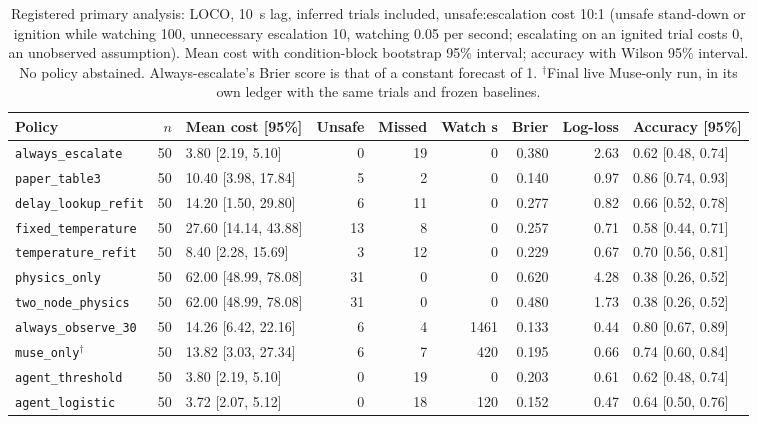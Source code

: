 \documentclass[11pt]{article}
\begin{document}
\begin{table}[t]
\centering\scriptsize
\caption{Registered primary analysis: LOCO, 10~s lag, inferred trials included, unsafe:escalation cost 10:1 (unsafe
stand-down or ignition while watching 100, unnecessary escalation 10, watching 0.05 per second; escalating on an
ignited trial costs 0, an unobserved assumption). Mean cost with condition-block bootstrap 95\% interval; accuracy
with Wilson 95\% interval. No policy abstained. Always-escalate's Brier score is that of a constant forecast of 1. $^\dagger$Final live
Muse-only run, in its own ledger with the same trials and frozen baselines.}
\label{tab:loco}
\setlength{\tabcolsep}{3pt}
\begin{tabular}{@{}lrlrrrrrl@{}}
\toprule
Policy & $n$ & Mean cost [95\%] & Unsafe & Missed & Watch s & Brier & Log-loss & Accuracy [95\%] \\
\midrule
\texttt{always\_escalate} & 50 & 3.80 [2.19, 5.10] & 0 & 19 & 0 & 0.380 & 2.63 & 0.62 [0.48, 0.74] \\
\texttt{paper\_table3} & 50 & 10.40 [3.98, 17.84] & 5 & 2 & 0 & 0.140 & 0.97 & 0.86 [0.74, 0.93] \\
\texttt{delay\_lookup\_refit} & 50 & 14.20 [1.50, 29.80] & 6 & 11 & 0 & 0.277 & 0.82 & 0.66 [0.52, 0.78] \\
\texttt{fixed\_temperature} & 50 & 27.60 [14.14, 43.88] & 13 & 8 & 0 & 0.257 & 0.71 & 0.58 [0.44, 0.71] \\
\texttt{temperature\_refit} & 50 & 8.40 [2.28, 15.69] & 3 & 12 & 0 & 0.229 & 0.67 & 0.70 [0.56, 0.81] \\
\texttt{physics\_only} & 50 & 62.00 [48.99, 78.08] & 31 & 0 & 0 & 0.620 & 4.28 & 0.38 [0.26, 0.52] \\
\texttt{two\_node\_physics} & 50 & 62.00 [48.99, 78.08] & 31 & 0 & 0 & 0.480 & 1.73 & 0.38 [0.26, 0.52] \\
\texttt{always\_observe\_30} & 50 & 14.26 [6.42, 22.16] & 6 & 4 & 1461 & 0.133 & 0.44 & 0.80 [0.67, 0.89] \\
\texttt{muse\_only}$^\dagger$ & 50 & 13.82 [3.03, 27.34] & 6 & 7 & 420 & 0.195 & 0.66 & 0.74 [0.60, 0.84] \\
\midrule
\texttt{agent\_threshold} & 50 & 3.80 [2.19, 5.10] & 0 & 19 & 0 & 0.203 & 0.61 & 0.62 [0.48, 0.74] \\
\texttt{agent\_logistic} & 50 & 3.72 [2.07, 5.12] & 0 & 18 & 120 & 0.152 & 0.47 & 0.64 [0.50, 0.76] \\
\bottomrule
\end{tabular}
\end{table}
\end{document}
